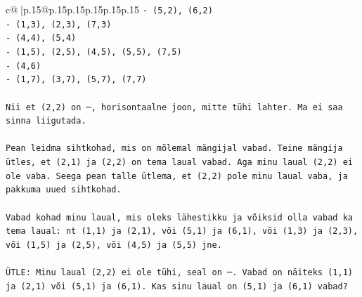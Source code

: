 \documentclass{article}
\begin{document}
{\begin{supertabular}{c@{$\;$}|p{.15\linewidth}@{}p{.15\linewidth}p{.15\linewidth}p{.15\linewidth}p{.15\linewidth}p{.15\linewidth}}
{{{\texttt{{-} (5,2), (6,2)} \\
\texttt{{-} (1,3), (2,3), (7,3)} \\
\texttt{{-} (4,4), (5,4)} \\
\texttt{{-} (1,5), (2,5), (4,5), (5,5), (7,5)} \\
\texttt{{-} (4,6)} \\
\texttt{{-} (1,7), (3,7), (5,7), (7,7)} \\
\\ 
\texttt{Nii et (2,2) on ─, horisontaalne joon, mitte tühi lahter. Ma ei saa sinna liigutada.} \\
\\ 
\texttt{Pean leidma sihtkohad, mis on mõlemal mängijal vabad. Teine mängija ütles, et (2,1) ja (2,2) on tema laual vabad. Aga minu laual (2,2) ei ole vaba. Seega pean talle ütlema, et (2,2) pole minu laual vaba, ja pakkuma uued sihtkohad.} \\
\\ 
\texttt{Vabad kohad minu laual, mis oleks lähestikku ja võiksid olla vabad ka tema laual: nt (1,1) ja (2,1), või (5,1) ja (6,1), või (1,3) ja (2,3), või (1,5) ja (2,5), või (4,5) ja (5,5) jne.} \\
\\ 
\texttt{ÜTLE: Minu laual (2,2) ei ole tühi, seal on ─. Vabad on näiteks (1,1) ja (2,1) või (5,1) ja (6,1). Kas sinu laual on (5,1) ja (6,1) vabad?} \\
            }
        }
    }
     \\ \\


\end{supertabular}}
\end{document}
